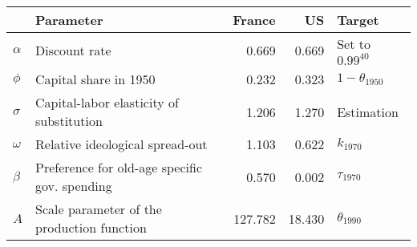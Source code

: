 
\begin{tabular}{llrrl}
\toprule
\textbf{} & \textbf{Parameter} & \textbf{France} & \textbf{US} & \textbf{Target}\\
\midrule
$\alpha$ & Discount rate & 0.669 & 0.669 & Set to $0.99^{40}$\\
$\phi$ & Capital share in 1950 & 0.232 & 0.323 & $1-\theta_{1950}$\\
$\sigma$ & Capital-labor elasticity of substitution & 1.206 & 1.270 & Estimation\\
$\omega$ & Relative ideological spread-out & 1.103 & 0.622 & $k_{1970}$\\
$\beta$ & Preference for old-age specific gov. spending & 0.570 & 0.002 & $\tau_{1970}$\\
$A$ & Scale parameter of the production function & 127.782 & 18.430 & $\theta_{1990}$\\
\bottomrule
\end{tabular}
